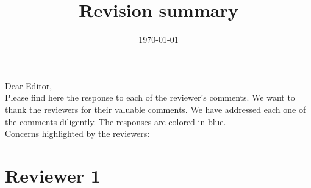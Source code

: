 \documentclass[a4paper]{amsart}
\theoremstyle{plain}
\theoremstyle{definition}
\theoremstyle{remark}
\numberwithin{equation}{section}
\begin{document}
\title[Revision summary]
      {Revision summary}

\maketitle

\date{\today}

Dear Editor,\\

Please find here the response to each of the reviewer's comments. We want to thank the reviewers for their valuable comments. We have addressed each one of the comments diligently. The responses are colored in blue.\\

Concerns highlighted by the reviewers:\\


\section*{Reviewer 1}
\end{document}
